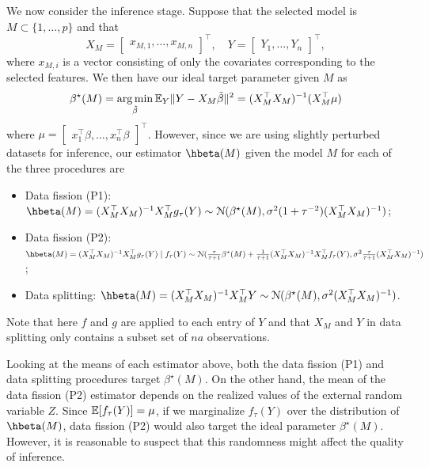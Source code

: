We now consider the inference stage. Suppose that the selected model is $M\subset\{1,\dots,p\}$ and that
\[
X_M = \begin{bmatrix} x_{M,1}, \dots, x_{M,n} \end{bmatrix}^\top, \quad Y = \begin{bmatrix} Y_1, \dots, Y_n \end{bmatrix}^\top,
\]
where $x_{M,i}$ is a vector consisting of only the covariates corresponding to the selected features. We then have our ideal target parameter given $M$ as
\[
\beta^\star(M) = \argmin_{\tilde{\beta}} \EE_Y \|Y - X_M\tilde{\beta}\|^2 = (X_M^\top X_M)^{-1}(X_M^\top\mu)
\]
where $\mu = \begin{bmatrix} x_1^\top\beta, \dots, x_n^\top\beta \end{bmatrix}^\top$. However, since we are using slightly perturbed datasets for inference, our estimator $\hbeta(M)$ given the model $M$ for each of the three procedures are
\begin{itemize}
\item Data fission (P1): $\hbeta(M) = (X_M^\top X_M)^{-1}X_M^\top g_\tau(Y) \distas \distNorm(\beta^\star(M), \sigma^2(1+\tau^{-2})(X_M^\top X_M)^{-1})$;
\item Data fission (P2):\\ $\hbeta(M) = (X_M^\top X_M)^{-1}X_M^\top g_\tau(Y) \given f_\tau(Y) \distas \distNorm(\frac{\tau}{\tau+1}\beta^\star(M) + \frac{1}{\tau+1}(X_M^\top X_M)^{-1}X_M^\top f_\tau(Y), \sigma^2\frac{\tau}{\tau+1}(X_M^\top X_M)^{-1})$;
\item Data splitting: $\hbeta(M) = (X_M^\top X_M)^{-1}X_M^\top Y \distas \distNorm(\beta^\star(M), \sigma^2(X_M^\top X_M)^{-1})$.
\end{itemize}
Note that here $f$ and $g$ are applied to each entry of $Y$ and that $X_M$ and $Y$ in data splitting only contains a subset set of $na$ observations.

Looking at the means of each estimator above, both the data fission (P1) and data splitting procedures target $\beta^\star(M)$. On the other hand, the mean of the data fission (P2) estimator depends on the realized values of the external random variable $Z$. Since $\mathbb{E}[f_\tau(Y)] = \mu$, if we marginalize $f_\tau(Y)$ over the distribution of $\hbeta(M)$, data fission (P2) would also target the ideal parameter $\beta^\star(M)$. However, it is reasonable to suspect that this randomness might affect the quality of inference.

